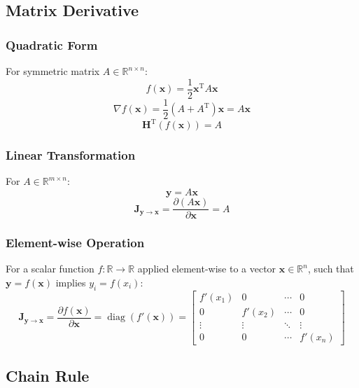 \documentclass{article}
\begin{document}
\subsection{Matrix Derivative}

\subsubsection{Quadratic Form}
For symmetric matrix $A \in \mathbb{R}^{n \times n}$:
\[
    f(\mathbf{x}) = \frac{1}{2}\mathbf{x}^{\mathrm{T}} A \mathbf{x}
\]
\[
    \nabla f(\mathbf{x}) = \frac{1}{2}(A + A^{\mathrm{T}})\mathbf{x} = A\mathbf{x}
\]
\[
    \mathbf{H}^{\mathrm{T}}(f(\mathbf{x})) = A
\]

\subsubsection{Linear Transformation}
For $A \in \mathbb{R}^{m \times n}$:
\[
    \mathbf{y} = A\mathbf{x}
\]
\[
    \mathbf{J}_{\mathbf{y} \to \mathbf{x}} = \frac{\partial (A\mathbf{x})}{\partial \mathbf{x}} = A
\]

\subsubsection{Element-wise Operation}
For a scalar function $f: \mathbb{R} \to \mathbb{R}$ applied element-wise to a vector $\mathbf{x} \in \mathbb{R}^n$, such that $\mathbf{y} = f(\mathbf{x})$ implies $y_i = f(x_i)$:
\[
    \mathbf{J}_{\mathbf{y} \to \mathbf{x}} = \frac{\partial f(\mathbf{x})}{\partial \mathbf{x}} = \operatorname{diag}(f'(\mathbf{x})) =
    \begin{bmatrix}
        f'(x_1) & 0 & \cdots & 0 \\
        0 & f'(x_2) & \cdots & 0 \\
        \vdots & \vdots & \ddots & \vdots \\
        0 & 0 & \cdots & f'(x_n)
    \end{bmatrix}
\]

\subsection{Chain Rule}
\end{document}
